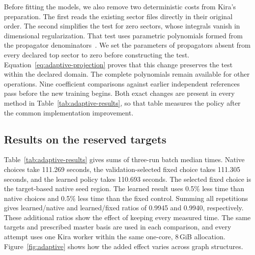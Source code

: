 Before fitting the models, we also remove two deterministic costs from Kira's preparation. The first reads the existing sector files directly in their original order. The second simplifies the test for zero sectors, whose integrals vanish in dimensional regularization. That test uses parametric polynomials formed from the propagator denominators~\cite{Lee2014LiteRed,Kira3}. We set the parameters of propagators absent from every declared top sector to zero before constructing the test. Equation~\eqref{eq:adaptive-projection} proves that this change preserves the test within the declared domain. The complete polynomials remain available for other operations. Nine coefficient comparisons against earlier independent references pass before the new training begins. Both exact changes are present in every method in Table~\ref{tab:adaptive-results}, so that table measures the policy after the common implementation improvement.

\subsection{Results on the reserved targets}
Table~\ref{tab:adaptive-results} gives sums of three-run batch median times. Native choices take 111.269 seconds, the validation-selected fixed choice takes 111.305 seconds, and the learned policy takes 110.693 seconds. The selected fixed choice is the target-based native seed region. The learned result uses 0.5\% less time than native choices and 0.5\% less time than the fixed control. Summing all repetitions gives learned/native and learned/fixed ratios of 0.9945 and 0.9940, respectively. These additional ratios show the effect of keeping every measured time. The same targets and prescribed master basis are used in each comparison, and every attempt uses one Kira worker within the same one-core, 8\,GiB allocation. Figure~\ref{fig:adaptive} shows how the added effect varies across graph structures.

